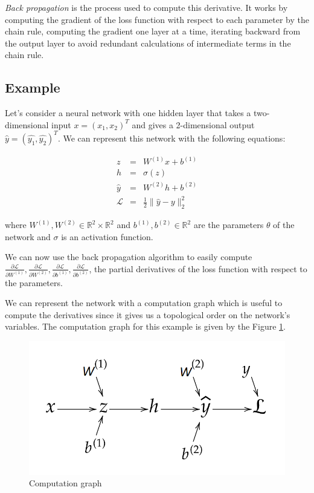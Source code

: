 \documentclass[10pt,a4paper]{article}
\theoremstyle{definition}
\theoremstyle{plain}
\begin{document}
\textit{Back propagation} \cite{11} is the process used to compute this derivative. It works by computing the gradient of the loss function with respect to each parameter by the chain rule, computing the gradient one layer at a time, iterating backward from the output layer to avoid redundant calculations of intermediate terms in the chain rule.

\subsection{Example} \label{exnn}
Let's consider a neural network with one hidden layer that takes a two-dimensional input $x = (x_1, x_2)^T$ and gives a 2-dimensional output $\hat{y} = (\hat{y_1},\hat{y_2})^T$. We can represent this network with the following equations:

\begin{eqnarray*}
z & = & W^{(1)}x + b^{(1)} \\ 
h & = & \sigma (z)\\
\hat{y} & = &  W^{(2)}h + b^{(2)} \\
\mathcal{L} & = & \frac{1}{2} \| \hat{y} - y \|_2^2
\end{eqnarray*}
   
where $W^{(1)}, W^{(2)} \in \mathbb{R}^2\times \mathbb{R}^2$ and $b^{(1)}, b^{(2)} \in \mathbb{R}^2$ are the parameters $\theta$ of the network and $\sigma$ is an activation function.

We can now use the back propagation algorithm to easily compute $\frac{\partial \mathcal{L}}{\partial W^{(1)}}, \frac{\partial \mathcal{L}}{\partial W^{(2)}},\frac{\partial \mathcal{L}}{\partial b^{(1)}},\frac{\partial \mathcal{L}}{\partial b^{(2)}}$, the partial derivatives of the loss function with respect to the parameters. 

We can represent the network with a computation graph which is useful to compute the derivatives since it gives us a topological order on the network's variables. The computation graph for this example is given by the Figure \ref{computgraph}.

\begin{figure}[h]
\center
\includegraphics[scale=0.5]{computation_graph.png}
\caption{Computation graph}
\label{computgraph}
\end{figure}
\end{document}
